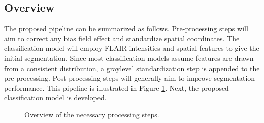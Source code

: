 \subsection{Overview}
The proposed pipeline can be summarized as follows. Pre-processing steps will aim to correct any bias field effect and standardize spatial coordinates. The classification model will employ FLAIR intensities and spatial features to give the initial segmentation. Since most classification models assume features are drawn from a consistent distribution, a graylevel standardization step is appended to the pre-processing. Post-processing steps will generally aim to improve segmentation performance. This pipeline is illustrated in Figure \ref{fig:pipeline}. Next, the proposed classification model is developed.
\begin{figure}
  \centering\scalebox{0.65}{}
  \caption{Overview of the necessary processing steps.}
  \label{fig:pipeline}
\end{figure}
